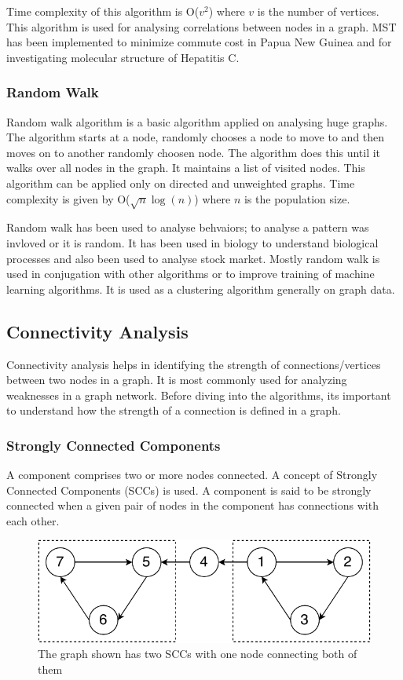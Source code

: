 \documentclass[journal,twoside,web]{ieeecolor}
\begin{document}
Time complexity of this algorithm is O($v^2$) where $v$ is the number of vertices. This algorithm is used for analysing correlations between nodes in a graph. MST has been implemented to minimize commute cost in Papua New Guinea\cite{13} and for investigating molecular structure of Hepatitis C\cite{50}.

\subsubsection{Random Walk}
Random walk algorithm is a basic algorithm applied on analysing huge graphs. The algorithm starts at a node, randomly chooses a node to move to and then moves on to another randomly choosen node. The algorithm does this until it walks over all nodes in the graph. It maintains a list of visited nodes. This algorithm can be applied only on directed and unweighted graphs. Time complexity is given by O($\sqrt{n}\log(n)$) where $n$ is the population size.

Random walk has been used to analyse behvaiors; to analyse a pattern was invloved or it is random. It has been used in biology to understand biological processes\cite{51} and also been used to analyse stock market\cite{52}. Mostly random walk is used in conjugation with other algorithms\cite{53} or to improve training of machine learning algorithms\cite{54}. It is used as a clustering algorithm generally on graph data.

\subsection{Connectivity Analysis}
Connectivity analysis helps in identifying the strength of connections/vertices between two nodes in a graph. It is most commonly used for analyzing weaknesses in a graph network. Before diving into the algorithms, its important to understand how the strength of a connection is defined in a graph.

\subsubsection{Strongly Connected Components}
\label{sec:scc}
A component comprises two or more nodes connected. A concept of Strongly Connected Components (SCCs)\cite{39} is used. A component is said to be strongly connected when a given pair of nodes in the component has connections with each other.

\begin{figure}[!h]
    \centerline{\includegraphics[scale=0.75]{figures/scc.pdf}}
    \caption{The graph shown has two SCCs with one node connecting both of them}
    \label{fig4}
\end{figure}
\end{document}
